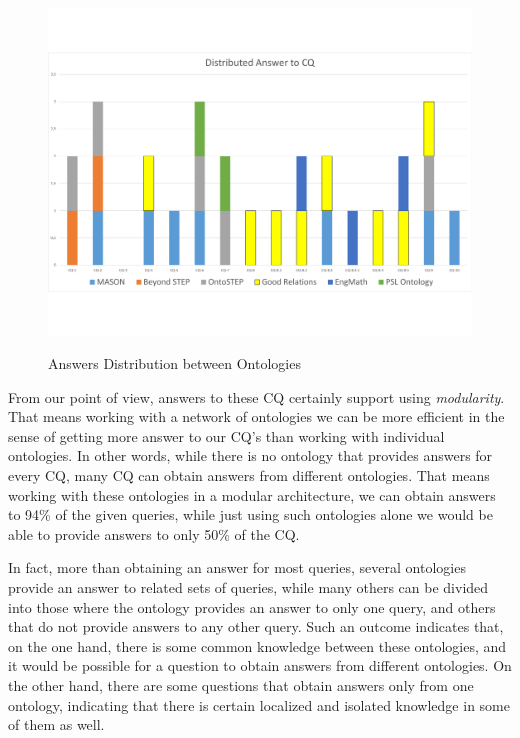 \begin{figure}
	\begin{center}
		\includegraphics[scale=0.5]{figure-chapterIV/fig4-7}\\
		\caption{Answers Distribution between Ontologies}
		\label{figure4-7}
	\end{center}
\end{figure}



\cbstart From our point of view, answers to these CQ certainly support using \textit{modularity}. That means working with a network of ontologies we can be more efficient in the sense of getting more answer to our CQ's than working with individual ontologies. In other words, while there is no ontology that provides answers for every CQ, many CQ can obtain answers from different ontologies. That means working with these ontologies in a modular architecture, we can obtain answers to 94\% of the given queries, while just using such ontologies alone we would be able to provide answers to only 50\% of the CQ. \cbend 

In fact, more than obtaining an answer for most queries, several ontologies provide an answer to related sets of queries, while many others can be divided into those where the ontology provides an answer to only one query, and others that do not provide answers to any other query.  Such an outcome indicates that, on  the one hand, there is some common knowledge between these ontologies, and it would be possible for a question to obtain answers from different ontologies. On the other hand, there are some questions that obtain answers only from one ontology, indicating that there is certain localized and isolated knowledge in some of them as well. 


